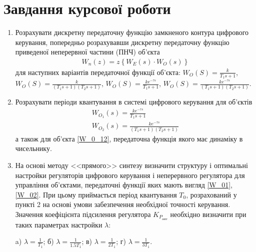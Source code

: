 \section{Завдання курсової роботи}
\begin{enumerate}
    \item Розрахувати дискретну передаточну функцію замкненого контура 
        цифрового керування, попередньо розрахувавши дискретну передаточну 
        функцію приведеної неперервної частини (ПНЧ) об'єкта
        \begin{gather}
            W_n(z) = z \left\{W_E(s) \cdot W_O(s) \right\}
        \end{gather} 
        для наступних варіантів передаточної функції об'єкта:
        $W_O(S) = \frac{k}{T_1 s + 1}$, $W_O(S) = \frac{k}{(T_1 s + 1)(T_2 s + 1)}$, 
        $W_O(S) = \frac{k e^{-\tau s}}{T_1 s + 1}$, $W_O(S) = \frac{k e^{-\tau s}}{(T_1 s + 1)(T_2 s + 1)}$.
    \item Розрахувати періоди квантування в системі цифрового керування для об'єктів
        \begin{gather}\label{W_01}
            W_{O_1}(s) = \frac{k e^{-\tau s}}{T_1 s + 1} \\
            \label{W_02}
            W_{O_2}(s) = \frac{k e^{-\tau s}}{(T_1 s + 1)(T_2 s + 1)}
        \end{gather}
        а також для об'єкта \eqref{W_0_12}, передаточна функція якого має динаміку в чисельнику.
    \item На основі методу <<прямого>> синтезу визначити структуру і оптимальні настройки регуляторів цифрового керування і неперервного
        регулятора для управління об'єктами, передаточні функції яких мають вигляд \eqref{W_01}, \eqref{W_02}. 
        При цьому приймається період квантування $T_0$, розрахований у пункті 2 на основі умови забезпечення необхідної точності керування.
        Значення коефіцієнта підсилення регулятора
        $K_{P_\text{опт}}$ необхідно визначити при таких параметрах настройки $\lambda$:

        a) $\lambda = \frac{1}{T_1}$; б) $\lambda = \frac{1}{1.5 T_1}$; в) $\lambda = \frac{1}{2T_1}$; г) $\lambda = \frac{1}{3T_1}$.


\end{enumerate}

